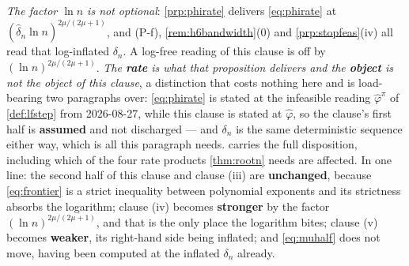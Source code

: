 \medskip
\noindent
\emph{The factor $\ln n$ is not optional}: \cref{prp:phirate} delivers \eqref{eq:phirate} at
$(\hat\delta_n\ln n)^{2\mu/(2\mu+1)}$, and (P-f),
\cref{rem:h6bandwidth}\textup{(0)} and \cref{prp:stopfeas}\textup{(iv)} all read that log-inflated
$\delta_n$. A log-free reading of this clause is off by $(\ln n)^{2\mu/(2\mu+1)}$.
\emph{The \textbf{rate} is what that proposition delivers and the \textbf{object} is not the object of
this clause}, a distinction that costs nothing here and is load-bearing two paragraphs over:
\eqref{eq:phirate} is stated at the infeasible reading $\hat\varphi^{\pi}$ of \cref{def:lfstep} from
2026-08-27, while this clause is stated at $\hat\varphi$, so the clause's first half is
\textbf{assumed} and not discharged --- and $\delta_n$ is the same deterministic sequence either way,
which is all this paragraph needs.
 carries the full disposition, including which of the four rate products
\cref{thm:rootn} needs are affected. In one line: the second half of this clause and clause (iii) are
\textbf{unchanged}, because \eqref{eq:frontier} is a strict inequality between polynomial exponents and its
strictness absorbs the logarithm; clause (iv) becomes \textbf{stronger} by the factor $(\ln n)^{2\mu/(2\mu+1)}$,
and that is the only place the logarithm bites; clause (v) becomes \textbf{weaker}, its right-hand side being
inflated; and \eqref{eq:muhalf} does not move, having been computed at the inflated $\delta_n$ already.

